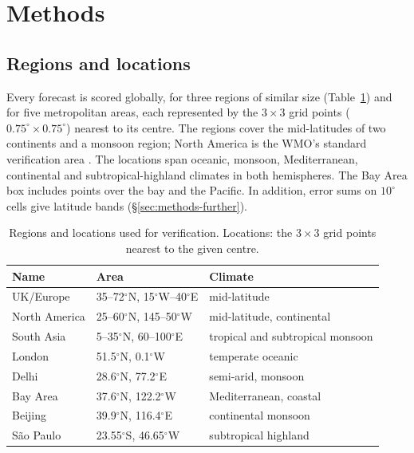\section{Methods}
\label{sec:methods}

\subsection{Regions and locations}
\label{sec:methods-regions}

Every forecast is scored globally, for three regions of
similar size (Table~\ref{tab:regions}) and for five metropolitan areas,
each represented by the $3\times3$ grid points
($0.75^\circ\times0.75^\circ$) nearest to its centre. The regions cover the
mid-latitudes of two continents and a monsoon region; North America is the
WMO's standard verification area \citep{wmo2010gdpfs}. The
locations span oceanic, monsoon, Mediterranean, continental and
subtropical-highland climates in both hemispheres. The Bay Area box
includes points over the bay and the Pacific. In addition, error sums on
$10^\circ$ cells give latitude bands
(\S\ref{sec:methods-further}).

\begin{table}[tbp]
\centering
\small
\caption{Regions and locations used for verification. Locations: the
$3\times3$ grid points nearest to the given centre.}
\label{tab:regions}
\begin{tabular}{lll}
\toprule
Name & Area & Climate \\
\midrule
UK/Europe & 35--72$^\circ$N, 15$^\circ$W--40$^\circ$E & mid-latitude \\
North America & 25--60$^\circ$N, 145--50$^\circ$W & mid-latitude, continental \\
South Asia & 5--35$^\circ$N, 60--100$^\circ$E & tropical and subtropical monsoon \\
\midrule
London & 51.5$^\circ$N, 0.1$^\circ$W & temperate oceanic \\
Delhi & 28.6$^\circ$N, 77.2$^\circ$E & semi-arid, monsoon \\
Bay Area & 37.6$^\circ$N, 122.2$^\circ$W & Mediterranean, coastal \\
Beijing & 39.9$^\circ$N, 116.4$^\circ$E & continental monsoon \\
S\~{a}o Paulo & 23.55$^\circ$S, 46.65$^\circ$W & subtropical highland \\
\bottomrule
\end{tabular}
\end{table}

